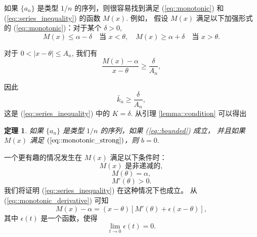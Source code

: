 \documentclass{article}
\newtheorem{theorem}{定理}
\begin{document}
如果 $\{a_n\}$ 是类型 $1/n$ 的序列，则很容易找到满足 (\ref{eq::monotonic}) 
和 (\ref{eq::series_inequality}) 的函数 $M(x)$. 例如，
假设 $M(x)$ 满足以下加强形式的 (\ref{eq::monotonic})：对于某个 $\delta > 0$, 
\begin{equation}
    \label{eq::monotonic_strong}
M(x) \leq \alpha - \delta \quad \text{当 } x < \theta, 
\quad M(x) \geq \alpha + \delta \quad \text{当 } x > \theta. \tag{5'}
\end{equation}

对于 $0 < |x - \theta| \leq A_n$, 我们有
\begin{equation}
    \frac{M(x) - \alpha}{x - \theta} \geq \frac{\delta}{A_n},
\end{equation}

因此
\begin{equation}
    \bar{k}_n \geq \frac{\delta}{A_n},
\end{equation}
这是 (\ref{eq::series_inequality}) 中的 $K = \delta$. 从引理 \ref{lemma::condition} 
可以得出

\begin{theorem}
\label{thm::main_1}
如果 $\{a_n\}$ 是类型 $1/n$ 的序列，如果 (\ref{eq::bounded}) 成立，
并且如果 $M(x)$ 满足 $(\ref{eq::monotonic_strong})$，则 $b = 0$.
\end{theorem}

一个更有趣的情况发生在 $M(x)$ 满足以下条件时：
\begin{equation}
    \label{eq::monotonic_condition}
    M(x) \text{ 是非递减的},
\end{equation}
\begin{equation}
    \label{eq::monotonic_constant}
    M(\theta) = \alpha,
\end{equation}
\begin{equation}
    \label{eq::monotonic_derivative}
    M'(\theta) > 0.
\end{equation}
我们将证明 (\ref{eq::series_inequality}) 在这种情况下也成立。
从 (\ref{eq::monotonic_derivative}) 可知
\begin{equation}
    M(x) - \alpha = (x - \theta)[M'(\theta) + \epsilon(x - \theta)],
\end{equation}
其中 $\epsilon(t)$ 是一个函数，使得
\begin{equation}
    \lim_{t \to 0} \epsilon(t) = 0.
\end{equation}
\end{document}
